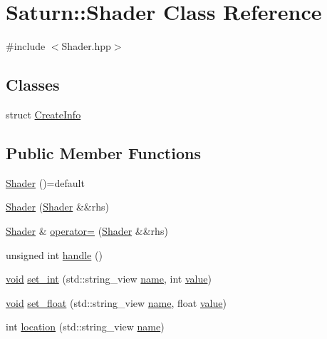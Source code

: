 \hypertarget{class_saturn_1_1_shader}{}\section{Saturn\+:\+:Shader Class Reference}
\label{class_saturn_1_1_shader}


{\ttfamily \#include $<$Shader.\+hpp$>$}

\subsection*{Classes}
\begin{DoxyCompactItemize}
\item 
struct \mbox{\hyperlink{struct_saturn_1_1_shader_1_1_create_info}{Create\+Info}}
\end{DoxyCompactItemize}
\subsection*{Public Member Functions}
\begin{DoxyCompactItemize}
\item 
\mbox{\hyperlink{class_saturn_1_1_shader_ac844565e800b21281d447361e88ccfd6}{Shader}} ()=default
\item 
\mbox{\hyperlink{class_saturn_1_1_shader_abecdd4196df24376e4ef6ad16a28a4e0}{Shader}} (\mbox{\hyperlink{class_saturn_1_1_shader}{Shader}} \&\&rhs)
\item 
\mbox{\hyperlink{class_saturn_1_1_shader}{Shader}} \& \mbox{\hyperlink{class_saturn_1_1_shader_a44c7204f9a2580073f4064af460a0b1d}{operator=}} (\mbox{\hyperlink{class_saturn_1_1_shader}{Shader}} \&\&rhs)
\item 
unsigned int \mbox{\hyperlink{class_saturn_1_1_shader_a10f70a410490c8437d38e262a8e863eb}{handle}} ()
\item 
\mbox{\hyperlink{glad_8h_a950fc91edb4504f62f1c577bf4727c29}{void}} \mbox{\hyperlink{class_saturn_1_1_shader_a581b02afaa31dd07ed65e530fd742979}{set\+\_\+int}} (std\+::string\+\_\+view \mbox{\hyperlink{glad_8h_aaced7cfc21e7d37775d6921bb8177239}{name}}, int \mbox{\hyperlink{glad_8h_a7ab00df62abe96de01795dc0d15959db}{value}})
\item 
\mbox{\hyperlink{glad_8h_a950fc91edb4504f62f1c577bf4727c29}{void}} \mbox{\hyperlink{class_saturn_1_1_shader_a5fe55e96741b63bca10105f492a3d735}{set\+\_\+float}} (std\+::string\+\_\+view \mbox{\hyperlink{glad_8h_aaced7cfc21e7d37775d6921bb8177239}{name}}, float \mbox{\hyperlink{glad_8h_a7ab00df62abe96de01795dc0d15959db}{value}})
\item 
int \mbox{\hyperlink{class_saturn_1_1_shader_a63d7efc6ec1283109db058770df501f7}{location}} (std\+::string\+\_\+view \mbox{\hyperlink{glad_8h_aaced7cfc21e7d37775d6921bb8177239}{name}})
\end{DoxyCompactItemize}
